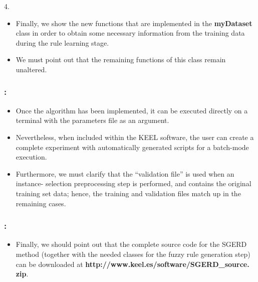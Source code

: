 \documentclass{beamer}
\begin{document}
\begin{CJK*}{UTF8}{bsmi}
\begin{frame}
	\begin{block}{4.}
		\begin{itemize}
			\item Finally, we show the new functions that are implemented in the \textbf{myDataset} class in order to obtain some necessary information from the training data during the rule learning stage. 
			\item We must point out that the remaining functions of this class remain unaltered.
		\end{itemize}
	\end{block}
	
\end{frame}

\begin{frame}
	\frametitle{\insertsection : \insertsubsection}
	

		\begin{itemize}
			\item Once the algorithm has been implemented, it can be executed directly on a terminal with the parameters file as an argument.
			\item Nevertheless, when included within the KEEL software, the user can create a complete experiment with automatically generated scripts for a batch-mode execution.
			\item Furthermore, we must clarify that the “validation file” is used when an instance- selection preprocessing step is performed, and contains the original training set data; hence, the training and validation files match up in the remaining cases.
		\end{itemize}

	
\end{frame}

\begin{frame}
	\frametitle{\insertsection : \insertsubsection}
	
	
	\begin{itemize}
		\item Finally, we should point out that the complete source code for the SGERD method (together with the needed classes for the fuzzy rule generation step)
can be downloaded at \textbf{http://www.keel.es/software/SGERD\_source. zip}.
	\end{itemize}
	
	
\end{frame}

\end{CJK*}
\end{document}
